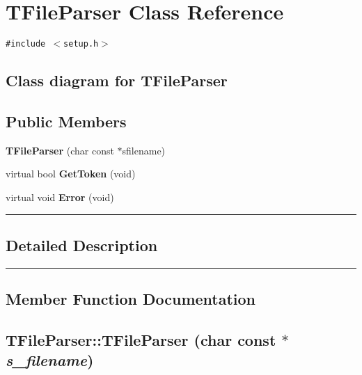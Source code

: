 \section{TFileParser  Class Reference}
\label{TFileParser}


{\tt \#include $<$setup.h$>$}

\subsection*{Class diagram for TFileParser}
\begin{figure}[H]
\begin{center}
\leavevmode
\setlength{\epsfysize}{2cm}
\end{center}
\end{figure}
\subsection*{Public Members}
\begin{CompactItemize}
\item 
{\bf TFile\-Parser} (char const $\ast$sfilename)
\item 
virtual bool {\bf Get\-Token} (void)
\item 
virtual void {\bf Error} (void)
\end{CompactItemize}
\vspace{0.4cm}\hrule\vspace{0.2cm}
\subsection*{Detailed Description}
\vspace{0.4cm}\hrule\vspace{0.2cm}
\subsection*{Member Function Documentation}
\label{TFileParser_a0}
\subsection{\setlength{\rightskip}{0pt plus 5cm}TFile\-Parser::TFile\-Parser (char const $\ast$ {\em s\_\-filename})}

\label{TFileParser_a1}
